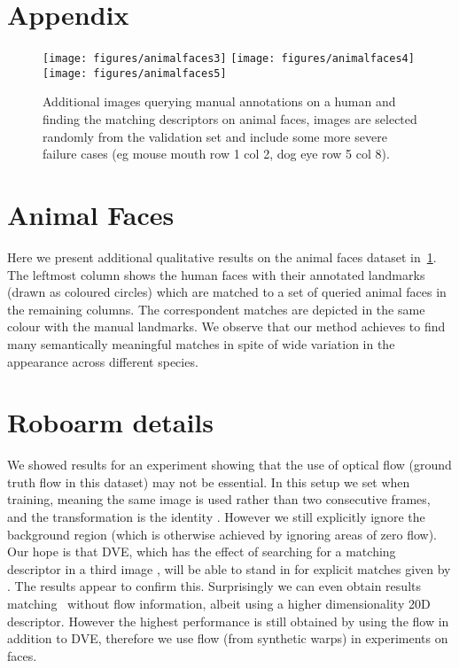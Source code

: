 \documentclass[10pt,twocolumn,letterpaper]{article}
\begin{document}
\clearpage
\onecolumn
\section*{Appendix}
\appendix


\begin{figure}[t]
	\centering
	\texttt{[image: figures/animalfaces3]}\vspace{-1pt}
	\texttt{[image: figures/animalfaces4]}\vspace{-1em}
	\texttt{[image: figures/animalfaces5]}
	
	\caption{Additional images querying manual annotations on a human and finding the matching descriptors on animal faces, images are selected randomly from the validation set and include some more severe failure cases (eg mouse mouth row 1 col 2, dog eye row 5 col 8).}\label{f:animalfacesmore}
\end{figure}

\section{Animal Faces}

Here we present additional qualitative results on the animal faces dataset in~\cref{f:animalfacesmore}. The leftmost column shows the human faces with their annotated landmarks (drawn as coloured circles) which are matched to a set of queried animal faces in the remaining columns. The correspondent matches are depicted in the same colour with the manual landmarks. We observe that our method achieves to find many semantically meaningful matches in spite of wide variation in the appearance across different species.



\section{Roboarm details}

We showed results for an experiment showing that the use of optical flow (ground truth flow in this dataset) may not be essential. In this setup we set  when training, meaning the same image is used rather than two consecutive frames, and the transformation is the identity . However we still explicitly ignore the background region (which is otherwise achieved by ignoring areas of zero flow). Our hope is that DVE, which has the effect of searching for a matching descriptor in a third image , will be able to stand in for explicit matches given by . The results appear to confirm this. Surprisingly we can even obtain results matching~\cite{thewlis17Bunsupervised} without flow information, albeit using a higher dimensionality 20D descriptor. However the highest performance is still obtained by using the flow in addition to DVE, therefore we use flow (from synthetic warps) in experiments on faces.
\end{document}
